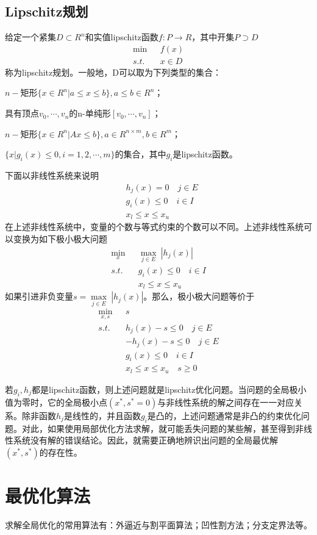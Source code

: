     \subsection{Lipschitz规划}
        \par
        给定一个紧集$D\subset R^n$和实值lipschitz函数$f:P\to R$，其中开集$P \supset D$
        \begin{align*}
        \mathop{\min}\  &f(x)\\
        s.t.\quad & x \in D
        \end{align*}
        称为lipschitz规划。一般地，D可以取为下列类型的集合：
        \par
        $n-$矩形$\{x\in R^n|a\leqslant x\leqslant b\},a\leqslant b\in R^n$；
        \par
        具有顶点$v_0,\cdots,v_n$的n-单纯形$[v_0,\cdots,v_n]$；
        \par
        $n-$矩形$\{x\in R^n|Ax\leqslant b\},a\in  R^{n\times m},b\in R^m$；
        \par
        $\{x|g_i(x)\leqslant 0,i=1,2,\cdots,m\}$的集合，其中$g_i$是lipschitz函数。
        \par
        下面以非线性系统来说明
        \begin{align*}
        &h_j(x)=0\quad j\in E\\
        & g_i(x)\leqslant 0\quad i\in I\\
        & x_l\leqslant x\leqslant x_u
        \end{align*}
        在上述非线性系统中，变量的个数与等式约束的个数可以不同。上述非线性系统可以变换为如下极小极大问题
        \begin{align*}
        \mathop{\min}\limits_{x}\ &\mathop{\max}\limits_{j\in E}\ |h_j(x)|\\
        s.t.\quad & g_i(x)\leqslant 0\quad i\in I\\
        &x_l\leqslant x\leqslant x_u
        \end{align*}
        如果引进非负变量$s=\mathop{\max}\limits_{j\in E}\  |h_j(x)|$。那么，极小极大问题等价于
        \begin{align*}
        \mathop{\min}\limits_{x,s}\  &s\\
        s.t.\quad & h_j(x)-s\leqslant 0\quad j\in E\\
        &-h_j(x)-s\leqslant 0\quad j\in E\\
        &g_i(x)\leqslant 0\quad i\in I\\
        &x_l\leqslant x\leqslant x_u\quad s\geqslant 0
        \end{align*}
        \par
        若$g_i,h_j$都是lipschitz函数，则上述问题就是lipschitz优化问题。当问题的全局极小值为零时，它的全局极小点$(x^*,s^*=0)$与非线性系统的解之间存在一一对应关系。除非函数$h_j$是线性的，并且函数$g_i$是凸的，上述问题通常是非凸的约束优化问题。对此，如果使用局部优化方法求解，就可能丢失问题的某些解，甚至得到非线性系统没有解的错误结论。因此，就需要正确地辨识出问题的全局最优解$(x^*,s^*)$的存在性。
\section{最优化算法}
        求解全局优化的常用算法有：外逼近与割平面算法；凹性割方法；分支定界法等。

% 
